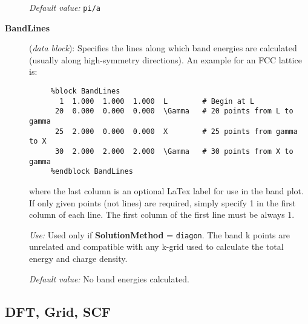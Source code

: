 \begin{description}
{\it Default value:} {\tt pi/a}


\item[{\bf BandLines}] ({\it data block}): 
Specifies the lines along which band energies are calculated
(usually along high-symmetry directions).
An example for an FCC lattice is:

\begin{verbatim}
     %block BandLines
       1  1.000  1.000  1.000  L        # Begin at L
      20  0.000  0.000  0.000  \Gamma   # 20 points from L to gamma
      25  2.000  0.000  0.000  X        # 25 points from gamma to X
      30  2.000  2.000  2.000  \Gamma   # 30 points from X to gamma
     %endblock BandLines
\end{verbatim}

where the last column is an optional LaTex label for use in the band plot.
If only given points (not lines) are required, simply specify 1 in the
first column of each line. The first column of the first line must be 
always 1.

{\it Use:} Used only if {\bf SolutionMethod} = {\tt diagon}.
The band k points are unrelated and compatible with any k-grid used
to calculate the total energy and charge density.

{\it Default value:} No band energies calculated.


\end{description}



\vspace{5pt}
\subsection{DFT, Grid, SCF}

